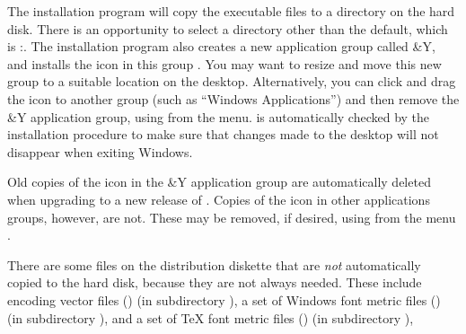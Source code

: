 The installation program will copy the executable files to a 
directory on the hard disk.  
There is an opportunity to select a directory other than the
default, which is \lavender\verb@c:\dviwindo@\revert.
The installation program also creates a new application group called
{\Y&Y}, and installs the {\DVIWindo} icon in this group%
.
You may want to resize and move this new group to a suitable
location on the desktop.
Alternatively, you can click and drag the {\DVIWindo} icon to
another group (such as ``Windows Applications'')  %
and then remove the %
{\Y&Y} application group, 
using  from the  menu.
 is automatically checked by the installation procedure
to make sure that changes made to the desktop will not disappear
when exiting Windows.


Old copies of the {\DVIWindo} icon in the {\Y&Y} application group are
automatically deleted when upgrading to a new release of {\DVIWindo}.  
Copies of the {\DVIWindo} icon in other applications groups, however, are not.
These may be removed, if desired, using  from the  menu%
.

There are some files on the distribution diskette that are {\it not\/}
automatically copied to the hard disk, because they are not always needed.
These include encoding vector files ({\VEC}) (in subdirectory ),
a set of Windows font metric files ({\PFM}) (in subdirectory ), 
and a set of {\TeX} font metric files ({\TFM}) (in subdirectory ), 

